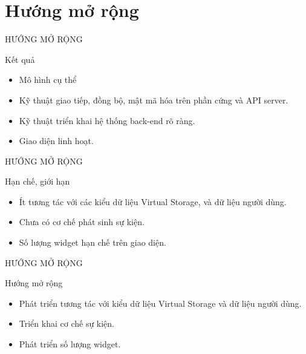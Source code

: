 \section{Hướng mở rộng}
\begin{frame}{HƯỚNG MỞ RỘNG}
    \begin{mybox}[blue]{Kết quả}
		\begin{itemize}
			\item Mô hình cụ thể
			\item Kỹ thuật giao tiếp, đồng bộ, mật mã hóa trên phần cứng và API server.
			\item Kỹ thuật triển khai hệ thống back-end rõ ràng.
			\item Giao diện linh hoạt.
		\end{itemize}
	\end{mybox}
\end{frame}

\begin{frame}{HƯỚNG MỞ RỘNG}
	\begin{mybox}[yellow]{Hạn chế, giới hạn}
		\begin{itemize}
			\item Ít tương tác với các kiểu dữ liệu Virtual Storage, và dữ liệu người dùng.
			\item Chưa có cơ chế phát sinh sự kiện.
			\item Số lượng widget hạn chế trên giao diện.
		\end{itemize}
	\end{mybox}
\end{frame}

\begin{frame}{HƯỚNG MỞ RỘNG}
	\begin{mybox}[green]{Hướng mở rộng}
		\begin{itemize}
			\item Phát triển tương tác với kiểu dữ liệu Virtual Storage và dữ liệu người dùng.
			\item Triển khai cơ chế sự kiện.
			\item Phát triển số lượng widget.
		\end{itemize}
	\end{mybox}
\end{frame}